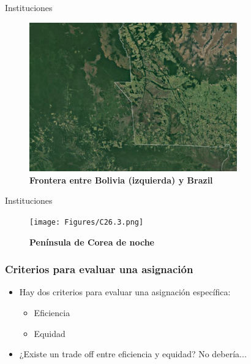 \documentclass{beamer}
\begin{document}
\begin{frame}{Instituciones}
    
\begin{figure}[H]
\begin{center}
\includegraphics[width=0.8\textwidth]{Figures/C26.2.png}
\end{center}
\caption{\textbf{Frontera entre Bolivia (izquierda) y Brazil}}
\label{fig:border_bol_bra}
\end{figure}
\end{frame}

\begin{frame}{Instituciones}
    \begin{figure}[H]
\begin{center}
\texttt{[image: Figures/C26.3.png]}
\end{center}
\caption{\textbf{Península de Corea de noche}}
\label{fig:korea}
\end{figure}

\end{frame}


\begin{frame} 
\frametitle{ Criterios para evaluar una asignación}
\begin{itemize}
\item Hay dos criterios para evaluar una asignación específica: 
\begin{itemize}
    \item Eficiencia
    \item Equidad
\end{itemize}
\item ¿Existe un trade off entre eficiencia y equidad? No debería...
\end{itemize}
\end{frame}
\end{document}
